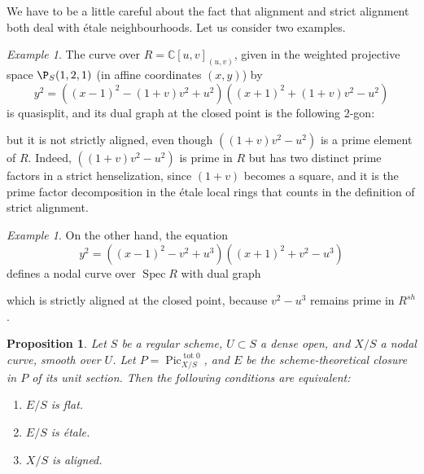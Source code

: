 \documentclass[a4paper,12pt]{amsart} %
\numberwithin{equation}{subsection}
\newcommand{\on}[1]{\operatorname{#1}}
\newcommand{\Spec}{\operatorname{Spec}}
\theoremstyle{definition}
\theoremstyle{plain}%
\newtheorem{proposition}[definition]{Proposition}
\theoremstyle{remark}
\newtheorem{example}[definition]{Example}
\begin{document}
	We have to be a little careful about the fact that alignment and strict alignment both deal with étale neighbourhoods. Let us consider two examples.

\begin{example} The curve over $R=\mathbb{C}[u,v]_{(u,v)}$, given in the weighted projective space $\P_S(1,2,1)$ (in affine coordinates $(x,y)$) by
\[
y^2=\left((x-1)^2-(1+v)v^2+u^2\right)\left((x+1)^2+(1+v)v^2-u^2\right)
\]
is quasisplit, and its dual graph at the closed point is the following 2-gon:

\begin{center}
\end{center}

but it is not strictly aligned, even though $((1+v)v^2-u^2)$ is a prime element of $R$. Indeed, $((1+v)v^2-u^2)$ is prime in $R$ but has two distinct prime factors in a strict henselization, since $(1+v)$ becomes a square, and it is the prime factor decomposition in the \'etale local rings that counts in the definition of strict alignment.
\end{example}

\begin{example} On the other hand, the equation
\[
y^2=\left((x-1)^2-v^2+u^3\right)\left((x+1)^2+v^2-u^3\right)
\]
defines a nodal curve over $\Spec R$ with dual graph

\begin{center}
\end{center}

which is strictly aligned at the closed point, because $v^2-u^3$ remains prime in $R^{sh}$.
\end{example}

\begin{proposition}\label{alignement et platitude de E}
	Let $S$ be a regular scheme, $U\subset S$ a dense open, and $X/S$ a nodal curve, smooth over $U$. Let $P=\operatorname{Pic}^{\on{tot}0}_{X/S}$, and $E$ be the scheme-theoretical closure in $P$ of its unit section. Then the following conditions are equivalent:
	
	\begin{enumerate}
		\item $E/S$ is flat.
		\item $E/S$ is \'etale.
		\item $X/S$ is aligned.
	\end{enumerate}
\end{proposition}
\end{document}
